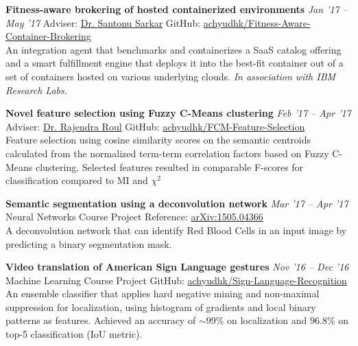 \documentclass[10pt]{article}
\newcommand{\halfblankline}{\quad\vspace{-0.5\baselineskip}\pagebreak[3]}
\begin{document}
\halfblankline

\textbf{Fitness-aware brokering of hosted containerized environments} \hfill \emph{Jan '17 -- May '17}
Adviser: \href{https://scholar.google.co.in/citations?user=8UNP6BIAAAAJ}{Dr. Santonu Sarkar} \hfill GitHub: \href{https://github.com/achyudhk/Fitness-Aware-Container-Brokering}{achyudhk/Fitness-Aware-Container-Brokering}
\vspace{0.5mm} \\
An integration agent that benchmarks and containerizes a SaaS catalog offering and a smart fulfillment engine that deploys it into the best-fit container out of a set of containers hosted on various underlying clouds. \textit{In association with IBM Research Labs.}

\halfblankline

\textbf{Novel feature selection using Fuzzy C-Means clustering} \hfill \emph{Feb '17 -- Apr '17}\\
Adviser: \href{http://www.bits-pilani.ac.in/goa/rkroul/Profile}{Dr. Rajendra Roul} \hfill GitHub: \href{https://github.com/achyudhk/FCM-Feature-Selection}{achyudhk/FCM-Feature-Selection}
\vspace{0.5mm} \\
Feature selection using cosine similarity scores on the semantic centroids calculated from the normalized term-term correlation factors based on Fuzzy C-Means clustering. Selected features resulted in comparable F-scores for classification compared to MI and $\chi^2$

\halfblankline

\textbf{Semantic segmentation using a deconvolution network} \hfill \emph{Mar '17 -- Apr '17}\\
Neural Networks Course Project \hfill Reference: \href{https://arxiv.org/abs/1505.04366}{arXiv:1505.04366}
\vspace{0.5mm} \\
A deconvolution network that can identify Red Blood Cells in an input image by predicting a binary segmentation mask.

\halfblankline

\textbf{Video translation of American Sign Language gestures} \hfill \emph{Nov '16 -- Dec '16} \\
Machine Learning Course Project \hfill GitHub: \href{https://github.com/achyudhk/Sign-Language-Recognition}{achyudhk/Sign-Language-Recognition}
\vspace{0.5mm} \\
An ensemble classifier that applies hard negative mining and non-maximal suppression for localization, using histogram of gradients and local binary patterns as features. Achieved an accuracy of $\sim$99\% on localization and 96.8\% on top-5 classification (IoU metric).
\end{document}
